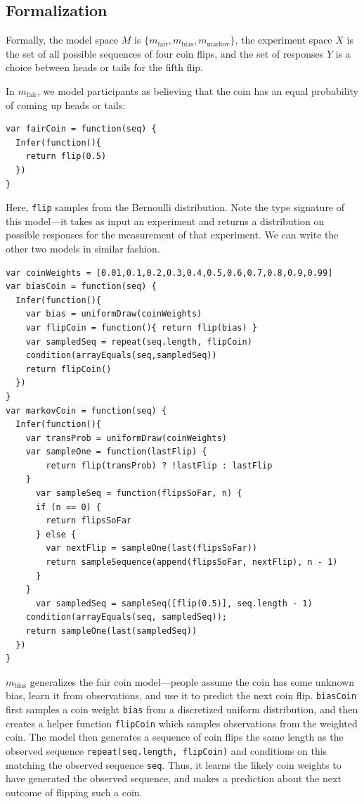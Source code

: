 \documentclass{article}
\begin{document}
\subsection{Formalization}

Formally, the model space $M$ is $\{m_{\text{fair}}, m_{\text{bias}}, m_{\text{markov}}\}$, the experiment space $X$ is the set of all possible sequences of four coin flips, and the set of responses $Y$ is a choice between heads or tails for the fifth flip.

In $m_{\text{fair}}$, we model participants as believing that the coin has an equal probability of coming up heads or tails:

\begin{lstlisting}[upquote=true]
var fairCoin = function(seq) {
  Infer(function(){
    return flip(0.5)
  })
}
\end{lstlisting}
Here, \lstinline{flip} samples from the Bernoulli distribution.
Note the type signature of this model---it takes as input an experiment and returns a distribution on possible responses for the measurement of that experiment.
We can write the other two models in similar fashion.
%
\begin{lstlisting}[upquote=true]
var coinWeights = [0.01,0.1,0.2,0.3,0.4,0.5,0.6,0.7,0.8,0.9,0.99]
var biasCoin = function(seq) {
  Infer(function(){
    var bias = uniformDraw(coinWeights)
    var flipCoin = function(){ return flip(bias) }
    var sampledSeq = repeat(seq.length, flipCoin)
    condition(arrayEquals(seq,sampledSeq))
    return flipCoin()
  })
}
var markovCoin = function(seq) {
  Infer(function(){
    var transProb = uniformDraw(coinWeights)
    var sampleOne = function(lastFlip) {
        return flip(transProb) ? !lastFlip : lastFlip
    }
 	  var sampleSeq = function(flipsSoFar, n) {
      if (n == 0) {
        return flipsSoFar
      } else {
        var nextFlip = sampleOne(last(flipsSoFar))
        return sampleSequence(append(flipsSoFar, nextFlip), n - 1)
      }
    }
	  var sampledSeq = sampleSeq([flip(0.5)], seq.length - 1)
    condition(arrayEquals(seq, sampledSeq));
    return sampleOne(last(sampledSeq))
  })
}
\end{lstlisting}
$m_{\text{bias}}$ generalizes the fair coin model---people assume the coin has some unknown bias, learn it from observations, and use it to predict the next coin flip.
\lstinline{biasCoin} first samples a coin weight \lstinline{bias} from a discretized uniform distribution, and
then creates a helper function \lstinline{flipCoin} which samples observations from the weighted coin.
The model then generates a sequence of coin flips the same length as the observed sequence \lstinline{repeat(seq.length, flipCoin)} and conditions on this matching the observed sequence \lstinline{seq}.
Thus, it learns the likely coin weights to have generated the observed sequence, and makes a prediction about the next outcome of flipping such a coin. 
\end{document}
